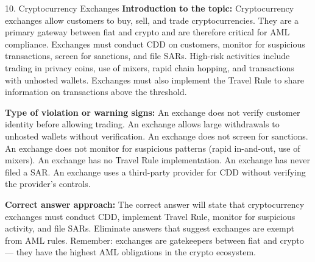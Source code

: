 \documentclass[11pt,a4paper]{beamer}
\begin{document}
\begin{frame}{10. Cryptocurrency Exchanges}
\tiny
\noindent\textbf{Introduction to the topic:} Cryptocurrency exchanges allow customers to buy, sell, and trade cryptocurrencies. They are a primary gateway between fiat and crypto and are therefore critical for AML compliance. Exchanges must conduct CDD on customers, monitor for suspicious transactions, screen for sanctions, and file SARs. High-risk activities include trading in privacy coins, use of mixers, rapid chain hopping, and transactions with unhosted wallets. Exchanges must also implement the Travel Rule to share information on transactions above the threshold.

\vspace{0.1cm}
\noindent\textbf{Type of violation or warning signs:} An exchange does not verify customer identity before allowing trading. An exchange allows large withdrawals to unhosted wallets without verification. An exchange does not screen for sanctions. An exchange does not monitor for suspicious patterns (rapid in-and-out, use of mixers). An exchange has no Travel Rule implementation. An exchange has never filed a SAR. An exchange uses a third-party provider for CDD without verifying the provider's controls.

\vspace{0.1cm}
\noindent\textbf{Correct answer approach:} The correct answer will state that cryptocurrency exchanges must conduct CDD, implement Travel Rule, monitor for suspicious activity, and file SARs. Eliminate answers that suggest exchanges are exempt from AML rules. Remember: exchanges are gatekeepers between fiat and crypto — they have the highest AML obligations in the crypto ecosystem.
\end{frame}
\end{document}
